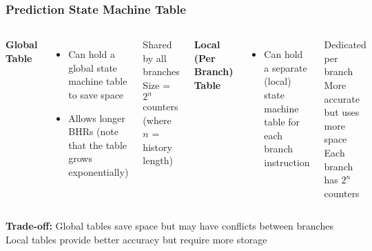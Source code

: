 \documentclass[aspectratio=169,12pt]{beamer}
\begin{document}
\begin{frame}
  \frametitle{Prediction State Machine Table}

  \begin{columns}[t]
    \textbf{\large Global Table}
    \vspace{0.3em}
    \begin{itemize}
      \item Can hold a global state machine table to save space
      \item Allows longer BHRs (note that the table grows exponentially)
    \end{itemize}

    \vspace{1em}
    \begin{tcolorbox}[colback=cyan!10, colframe=cyan!50]
      \footnotesize
      Shared by all branches\\
      Size = $2^n$ counters\\
      (where $n$ = history length)
    \end{tcolorbox}

    \textbf{\large Local (Per Branch) Table}
    \vspace{0.3em}
    \begin{itemize}
      \item Can hold a separate (local) state machine table for each branch instruction
    \end{itemize}

    \vspace{1em}
    \begin{tcolorbox}[colback=green!10, colframe=green!50]
      \footnotesize
      Dedicated per branch\\
      More accurate but uses more space\\
      Each branch has $2^n$ counters
    \end{tcolorbox}
  \end{columns}

  \vspace{1em}
  \begin{tcolorbox}[colback=orange!10, colframe=orange!50]
    \centering
    \textbf{Trade-off:} Global tables save space but may have conflicts between branches\\
    Local tables provide better accuracy but require more storage
  \end{tcolorbox}
\end{frame}
\end{document}
